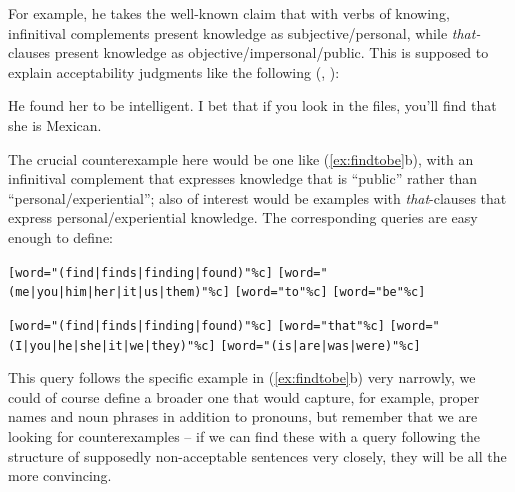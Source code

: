 For example, he takes the well-known claim that with verbs of knowing, infinitival complements present knowledge as subjective/personal, while \textit{that-}clauses present knowledge as objective/impersonal/public. This is supposed to explain acceptability judgments like the following (\citet[45--46]{corum_be_1973}, \citet[50, 136]{wierzbicka_semantics_1988}):

\begin{exe}
\ex
\begin{xlist} 
\label{ex:findtobe}
\ex He found her to be intelligent.
\ex I bet that if you look in the files, you'll find that she is Mexican.
\end{xlist}
\end{exe}

The crucial counterexample here would be one like (\ref{ex:findtobe}b), with an infinitival complement that expresses knowledge that is ``public'' rather than ``personal/experiential''; also of interest would be examples with \textit{that}-clauses that express personal/experiential knowledge. The corresponding queries are easy enough to define:

\begin{exe}
\ex
\begin{xlist} 
\label{ex:findtobequery}
\ex \begin{minipage}[t]{0.85\textwidth} \raggedright \texttt{[word="(find|\allowbreak finds|\allowbreak finding|\allowbreak found)"\%c]} \texttt{[word="(me|\allowbreak you|\allowbreak him|\allowbreak her|\allowbreak it|\allowbreak us|\allowbreak them)"\%c]} \texttt{[word="to"\%c]} \texttt{[word="be"\%c]} \end{minipage}
\ex \begin{minipage}[t]{0.85\textwidth} \raggedright \texttt{[word="(find|\allowbreak finds|\allowbreak finding|\allowbreak found)"\%c]} \texttt{[word="that"\%c]} \texttt{[word="(I|\allowbreak you|\allowbreak he|\allowbreak she|\allowbreak it|\allowbreak we|\allowbreak they)"\%c]} \texttt{[word="(is|\allowbreak are|\allowbreak was|\allowbreak were)"\%c]} \end{minipage}
\end{xlist}
\end{exe}

This query follows the specific example in (\ref{ex:findtobe}b) very narrowly, we could of course define a broader one that would capture, for example, proper names and noun phrases in addition to pronouns, but remember that we are looking for counterexamples -- if we can find these with a query following the structure of supposedly non-acceptable sentences very closely, they will be all the more convincing.

